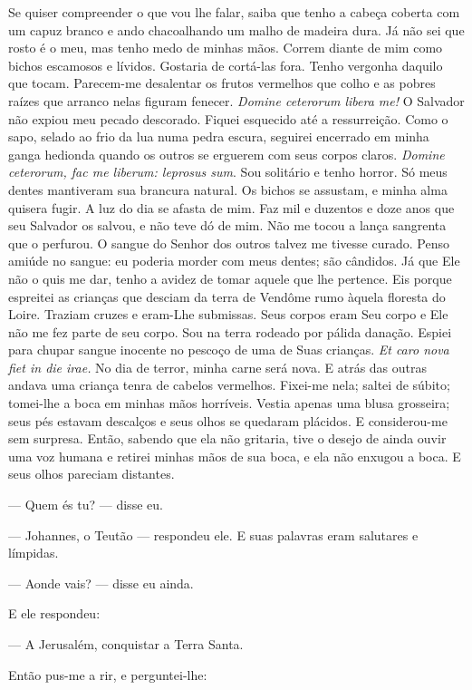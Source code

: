 Se quiser compreender o que vou lhe falar, saiba que tenho a cabeça coberta
com um capuz branco e ando chacoalhando um malho de madeira dura. Já não
sei que rosto é o meu, mas tenho medo de minhas mãos. Correm diante de mim
como bichos escamosos e lívidos. Gostaria de cortá-las fora. Tenho
vergonha daquilo que tocam. Parecem-me desalentar os frutos vermelhos que
colho e as pobres raízes que arranco nelas figuram fenecer. \textit{Domine
ceterorum libera me!} O Salvador não expiou meu pecado descorado. Fiquei
esquecido até a ressurreição. Como o sapo, selado ao frio da lua numa
pedra escura, seguirei encerrado em minha ganga hedionda quando os outros
se erguerem com seus corpos claros. \textit{Domine ceterorum, fac me
liberum: leprosus sum}.  Sou solitário e tenho horror. Só meus
dentes mantiveram sua brancura natural. Os bichos se assustam, e minha
alma quisera fugir. A luz do dia se afasta de mim. Faz mil e duzentos e
doze anos que seu Salvador os salvou, e não teve dó de mim. Não me tocou a
lança sangrenta que o perfurou. O sangue do Senhor dos outros talvez me
tivesse curado. Penso amiúde no sangue: eu poderia morder com meus dentes;
são cândidos. Já que Ele não o quis me dar, tenho a avidez de tomar aquele
que lhe pertence. Eis porque espreitei as crianças que desciam da terra de
Vendôme rumo àquela floresta do Loire. Traziam cruzes e eram-Lhe
submissas. Seus corpos eram Seu corpo e Ele não me fez parte de seu corpo.
Sou na terra rodeado por pálida danação. Espiei para chupar sangue
inocente no pescoço de uma de Suas crianças. \textit{Et caro nova fiet in
die irae.} No dia de terror, minha carne será nova. E atrás das outras
andava uma criança tenra de cabelos vermelhos. Fixei-me nela; saltei de
súbito; tomei-lhe a boca em minhas mãos horríveis. Vestia apenas uma blusa
grosseira; seus pés estavam descalços e seus olhos se quedaram plácidos. E
considerou-me sem surpresa. Então, sabendo que ela não gritaria, tive o
desejo de ainda ouvir uma voz humana e retirei minhas mãos de sua boca, e
ela não enxugou a boca. E seus olhos pareciam distantes.

--- Quem és tu? --- disse eu.

--- Johannes, o Teutão --- respondeu ele. E suas palavras eram salutares e
límpidas.

--- Aonde vais? --- disse eu ainda.

E ele respondeu:

--- A Jerusalém, conquistar a Terra Santa.

Então pus-me a rir, e perguntei-lhe:

